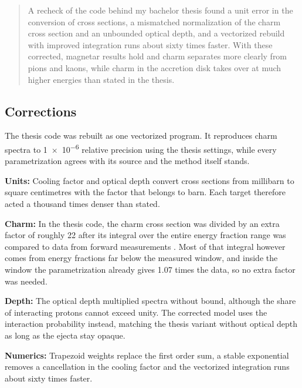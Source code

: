 	\onecolumn
		\maketitle
		\begin{abstract}
			A recheck of the code behind my bachelor thesis found a unit error in the conversion of cross sections, a mismatched normalization
			of the charm cross section and an unbounded optical depth, and a vectorized rebuild with improved integration runs about sixty
			times faster. With these corrected, magnetar results hold and charm separates more clearly from pions and kaons, while charm
			in the accretion disk takes over at much higher energies than stated in the thesis.
		\end{abstract}

	\begin{multicols}{2}

	\section{Corrections}

	The thesis code was rebuilt as one vectorized program. It reproduces charm spectra to \num{1e-6} relative precision using the thesis settings,
	while every parametrization agrees with its source and the method itself stands.

	\textbf{Units:} Cooling factor and optical depth convert cross sections from millibarn to square centimetres with the factor that belongs to
	barn. Each target therefore acted a thousand times denser than stated.

	\textbf{Charm:} In the thesis code, the charm cross section was divided by an extra factor of roughly \num{22} after its integral over the
	entire energy fraction range was compared to data from forward measurements \cite{aaij2016}. Most of that integral however comes from energy
	fractions far below the measured window, and inside the window the parametrization \cite{gonc2007} already gives \num{1.07} times the data,
	so no extra factor was needed.

	\textbf{Depth:} The optical depth multiplied spectra without bound, although the share of interacting protons cannot exceed unity.
	The corrected model uses the interaction probability instead, matching the thesis variant without optical depth as long as
	the ejecta stay opaque.

	\textbf{Numerics:} Trapezoid weights replace the first order sum, a stable exponential removes a cancellation in the cooling factor and
	the vectorized integration runs about sixty times faster.


\end{multicols}
